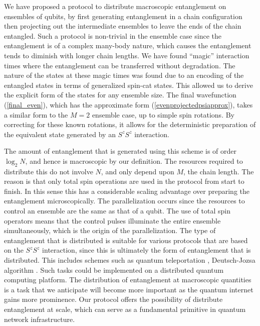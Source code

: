 \documentclass[12pt]{iopart}
\begin{document}
We have proposed a protocol to distribute macroscopic entanglement on ensembles of qubits, by first generating entanglement in a chain configuration then projecting out the intermediate ensembles to leave the ends of the chain entangled.  Such a protocol is non-trivial in the ensemble case since the entanglement is of a complex many-body nature, which causes the entanglement tends to diminish with longer chain lengths.  We have found ``magic'' interaction times where the entanglement can be transferred without degradation.  The nature of the states at these magic times was found due to an encoding of the entangled states in terms of generalized spin-cat states.  This allowed us to derive the explicit form of the states for any ensemble size. The final wavefunction (\ref{final_even}), which has the approximate form (\ref{evenprojectedpsiapprox}), takes a similar form to the $ M = 2 $ ensemble case, up to simple spin rotations.  By correcting for these known rotations, it allows for the deterministic preparation of the equivalent state generated by an $ S^z S^z $ interaction.  

The amount of entanglement that is generated using this scheme is of order $ \log_2 N$, and hence is macroscopic by our definition.   The resources required to distribute this do not involve $ N $, and only depend upon $ M $, the chain length.  The reason is that only total spin operations are used in the protocol from start to finish. In this sense this has a considerable scaling advantage over preparing the entanglement microscopically.  The parallelization occurs since the resources to control an ensemble are the same as that of a qubit. The use of total spin operators means that the control pulses illuminate the entire ensemble simultaneously, which is the origin of the parallelization.  The type of entanglement that is distributed is suitable for various protocols that are based on the $ S^z S^z $ interaction, since this is ultimately the form of entanglement that is distributed.  This includes schemes such as quantum teleportation \cite{pyrkov2014quantum,pyrkov2014full}, Deutsch-Jozsa algorithm \cite{semenenko2016implementing}. Such tasks could be implemented on a distributed quantum computing platform.  The distribution of entanglement at macroscopic quantities is a task that we anticipate will become more important as the quantum internet gains more prominence.  Our protocol offers the possibility of distribute entanglement at scale, which can serve as a fundamental primitive in quantum network infrastructure.  
\end{document}
